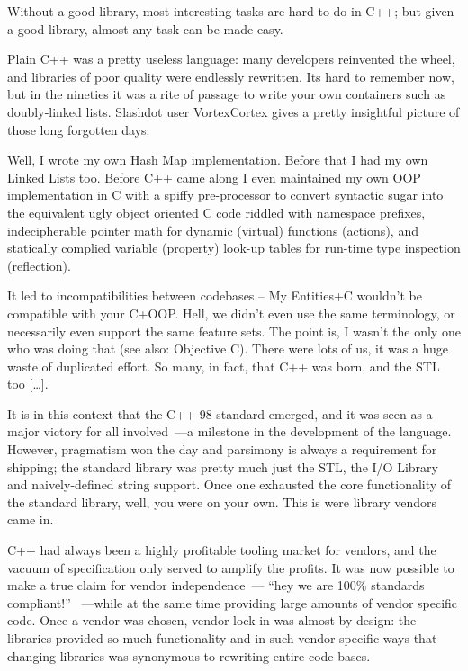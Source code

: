 \documentclass{book}
\begin{document}
Without a good library, most interesting tasks are hard to do in C++;
but given a good library, almost any task can be made easy.

Plain C++ was a pretty useless language: many developers reinvented
the wheel, and libraries of poor quality were endlessly rewritten. Its
hard to remember now, but in the nineties it was a rite of passage to
write your own containers such as doubly-linked lists. Slashdot user
VortexCortex gives a pretty insightful picture of those long forgotten
days:

Well, I wrote my own Hash Map implementation. Before that I had my own
Linked Lists too. Before C++ came along I even maintained my own OOP
implementation in C with a spiffy pre-processor to convert syntactic
sugar into the equivalent ugly object oriented C code riddled with
namespace prefixes, indecipherable pointer math for dynamic (virtual)
functions (actions), and statically complied variable (property)
look-up tables for run-time type inspection (reflection).

It led to incompatibilities between codebases – My Entities+C wouldn't
be compatible with your C+OOP. Hell, we didn't even use the same
terminology, or necessarily even support the same feature sets. The
point is, I wasn't the only one who was doing that (see also:
Objective C). There were lots of us, it was a huge waste of duplicated
effort. So many, in fact, that C++ was born, and the STL too […].

It is in this context that the C++ 98 standard emerged, and it was
seen as a major victory for all involved~---a milestone in the
development of the language. However, pragmatism won the day and
parsimony is always a requirement for shipping; the standard library
was pretty much just the STL, the I/O Library and naively-defined
string support. Once one exhausted the core functionality of the
standard library, well, you were on your own. This is were library
vendors came in.

C++ had always been a highly profitable tooling market for vendors,
and the vacuum of specification only served to amplify the profits. It
was now possible to make a true claim for vendor independence~---
``hey we are 100\% standards compliant!'' ~---while at the same time
providing large amounts of vendor specific code. Once a vendor was
chosen, vendor lock-in was almost by design: the libraries provided so
much functionality and in such vendor-specific ways that changing
libraries was synonymous to rewriting entire code bases.
\end{document}
